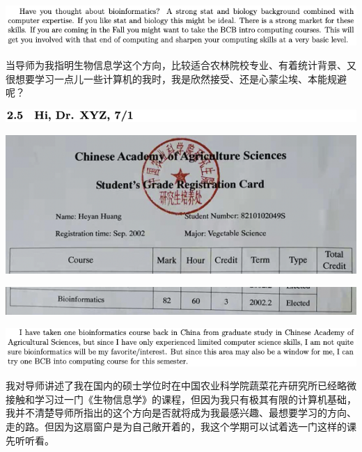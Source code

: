 \documentclass[9pt, b5paper]{article}
\begin{document}
\begin{center}
\includegraphics[width=.9\linewidth]{./pic/backups_plans_20210421_090620.png}
\end{center}

当导师为我指明生物信息学这个方向，比较适合农林院校专业、有着统计背景、又很想要学习一点儿一些计算机的我时，我是欣然接受、还是心蒙尘埃、本能规避呢？

\begin{center}
\includegraphics[width=.9\linewidth]{./pic/backups_plans_20210421_090714.png}
\end{center}

\begin{center}
\includegraphics[width=.9\linewidth]{./pic/backups_plans_20210419_094833.png}
\end{center}

\begin{center}
\includegraphics[width=.9\linewidth]{./pic/backups_plans_20210419_094910.png}
\end{center}

\begin{center}
\includegraphics[width=.9\linewidth]{./pic/backups_plans_20210419_085406.png}
\end{center}

我对导师讲述了我在国内的硕士学位时在中国农业科学院蔬菜花卉研究所已经略微接触和学习过一门《生物信息学》的课程，但因为我只有极其有限的计算机基础，我并不清楚导师所指出的这个方向是否就将成为我最感兴趣、最想要学习的方向、走的路。但因为这扇窗户是为自己敞开着的，我这个学期可以试着选一门这样的课先听听看。
\end{document}
